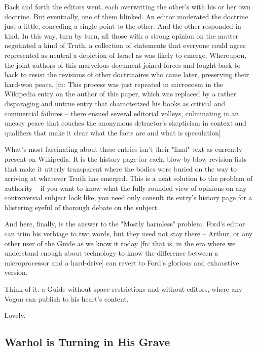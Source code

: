Back and forth the editors went, each overwriting the other's with
his or her own doctrine. But eventually, one of them blinked. An
editor moderated the doctrine just a little, conceding a single
point to the other. And the other responded in kind. In this way,
turn by turn, all those with a strong opinion on the matter
negotiated a kind of Truth, a collection of statements that
everyone could agree represented as neutral a depiction of Israel
as was likely to emerge. Whereupon, the joint authors of this
marvelous document joined forces and fought back to back to resist
the revisions of other doctrinaires who came later, preserving
their hard-won peace. [fn: This process was just repeated in
microcosm in the Wikipedia entry on the author of this paper, which
was replaced by a rather disparaging and untrue entry that
characterized his books as critical and commercial failures --
there ensued several editorial volleys, culminating in an uneasy
peace that couches the anonymous detractor's skepticism in context
and qualifiers that make it clear what the facts are and what is
speculation]

What's most fascinating about these entries isn't their "final"
text as currently present on Wikipedia. It is the history page for
each, blow-by-blow revision lists that make it utterly transparent
where the bodies were buried on the way to arriving at whatever
Truth has emerged. This is a neat solution to the problem of
authority -- if you want to know what the fully rounded view of
opinions on any controversial subject look like, you need only
consult its entry's history page for a blistering eyeful of
thorough debate on the subject.

And here, finally, is the answer to the "Mostly harmless" problem.
Ford's editor can trim his verbiage to two words, but they need not
stay there -- Arthur, or any other user of the Guide as we know it
today [fn: that is, in the era where we understand enough about
technology to know the difference between a microprocessor and a
hard-drive] can revert to Ford's glorious and exhaustive version.

Think of it: a Guide without space restrictions and without
editors, where any Vogon can publish to his heart's content.

Lovely.

\subsection{Warhol is Turning in His Grave}

